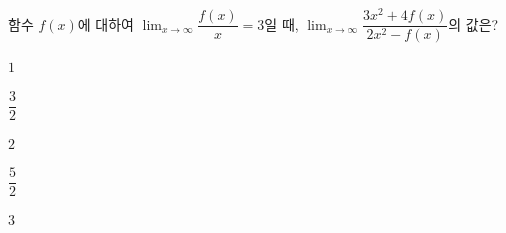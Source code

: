 함수 $f(x)$에 대하여 $\displaystyle\lim_{x\to\infty}\dfrac{f(x)}{x}=3$일 때, $\displaystyle\lim_{x\to\infty}\dfrac{3x^2+4f(x)}{2x^2-f(x)}$의 값은?
\begin{choices32}{\rule[-3ex]{0pt}{8ex}$1$}{\rule[-3ex]{0pt}{8ex}$\dfrac{3}{2}$}{\rule[-3ex]{0pt}{8ex}$2$}{\rule[-3ex]{0pt}{8ex}$\dfrac{5}{2}$}{\rule[-3ex]{0pt}{8ex}$3$}\end{choices32}
